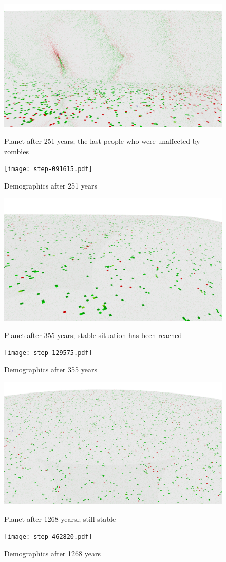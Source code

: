 \documentclass[a4paper]{article}
\begin{document}
\begin{figure}[pht]
    \centering
    \includegraphics[width=\textwidth]{torus/step-091615-torus.png}
    \caption{Planet after 251 years; the last people who were unaffected by zombies}
    \texttt{[image: step-091615.pdf]}
    \caption{Demographics after 251 years}
\end{figure}

\begin{figure}[pht]
    \centering
    \includegraphics[width=\textwidth]{torus/step-129575-torus.png}
    \caption{Planet after 355 years; stable situation has been reached}
    \texttt{[image: step-129575.pdf]}
    \caption{Demographics after 355 years}
\end{figure}

\begin{figure}[pht]
    \centering
    \includegraphics[width=\textwidth]{torus/step-462820-torus.png}
    \caption{Planet after 1268 yearsl; still stable}
    \texttt{[image: step-462820.pdf]}
    \caption{Demographics after 1268 years}
\end{figure}
\end{document}
